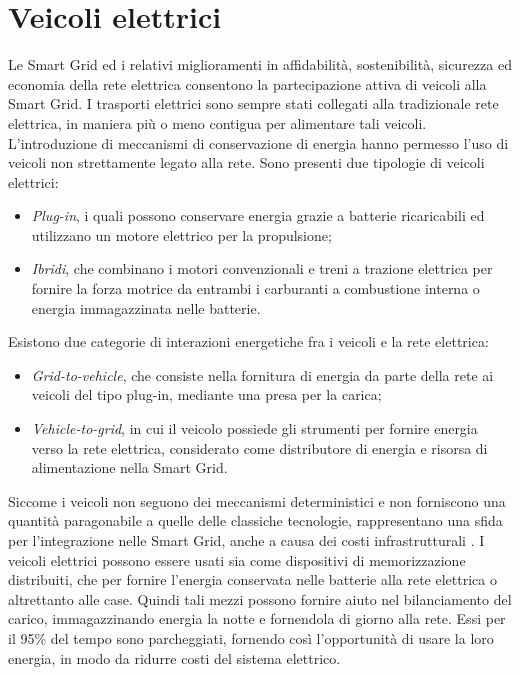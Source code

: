 \section{Veicoli elettrici}
Le Smart Grid ed i relativi miglioramenti in affidabilità, sostenibilità, sicurezza ed economia della rete elettrica consentono la partecipazione attiva di veicoli alla Smart Grid. I trasporti elettrici sono sempre stati collegati alla tradizionale rete elettrica, in maniera più o meno contigua per alimentare tali veicoli. L'introduzione di meccanismi di conservazione di energia hanno permesso l'uso di veicoli non strettamente legato alla rete.
Sono presenti due tipologie di veicoli elettrici:
\begin{itemize}
	\item \emph{Plug-in}, i quali possono conservare energia grazie a batterie ricaricabili ed utilizzano un motore elettrico per la propulsione;
	\item \emph{Ibridi}, che combinano i motori convenzionali e treni a trazione elettrica per fornire la forza motrice da entrambi i carburanti a combustione interna o energia immagazzinata nelle batterie.  
\end{itemize}     
Esistono due categorie di interazioni energetiche fra i veicoli e la rete elettrica:
\begin{itemize}
	\item \emph{Grid-to-vehicle}, che consiste nella fornitura di energia da parte della rete ai veicoli del tipo plug-in, mediante una presa per la carica;
	\item \emph{Vehicle-to-grid}, in cui il veicolo possiede gli strumenti per fornire energia verso la rete elettrica, considerato come distributore di energia e risorsa di alimentazione nella Smart Grid.
\end{itemize}

Siccome i veicoli non seguono dei meccanismi deterministici e non forniscono una quantità paragonabile a quelle delle classiche tecnologie, rappresentano una sfida per l'integrazione nelle Smart Grid, anche a causa dei costi infrastrutturali \cite{vehicl}. 
I veicoli elettrici possono essere usati sia come dispositivi di memorizzazione distribuiti, che per fornire l'energia conservata nelle batterie alla rete elettrica o altrettanto alle case. 
Quindi tali mezzi possono fornire aiuto nel bilanciamento del carico, immagazzinando energia la notte e fornendola di giorno alla rete. Essi per il 95\% del tempo sono parcheggiati, fornendo così l'opportunità di usare la loro energia, in modo da ridurre costi del sistema elettrico.


